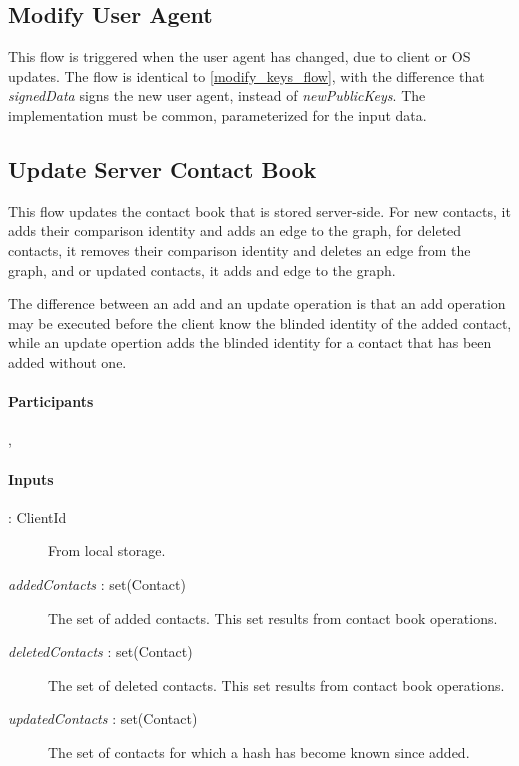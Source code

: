 \documentclass[a4paper,10pt]{article}
\newcommand{\signedData}{\emph{signedData}}
\newcommand{\newPublicKeys}{\emph{newPublicKeys}}
\newcommand{\identity}[1]{\parenthesize{identity}{#1}}
\newcommand{\addedContacts}{{\em addedContacts}}
\newcommand{\deletedContacts}{{\em deletedContacts}}
\newcommand{\updatedContacts}{{\em updatedContacts}}
\begin{document}
\subsection{Modify User Agent}
\label{modify_user_agent_flow}
This flow is triggered when the user agent has changed, due to client or OS updates. The flow is identical to \ref{modify_keys_flow}, with the difference that \signedData{} 
signs the new user agent, instead of \newPublicKeys{}. The implementation must be common, parameterized for the input data.

\subsection{Update Server Contact Book}
\label{update_server_bontact_book_flow}
This flow updates the contact book that is stored server-side. For new contacts, it adds their comparison identity and adds an edge to the graph, for deleted contacts, it removes their comparison identity and deletes an edge from the graph, and or updated contacts, it adds and edge to the graph.

The difference between an add and an update operation is that an add operation may be executed before the client know the blinded identity of the added contact, while an update opertion adds the blinded identity for a contact that has been added without one.

\paragraph{Participants} , \Server{}

\paragraph{Inputs}
\SpecialItem
\begin{description}
 \item[\identity{A} : ClientId] From  local storage.
 \item[\addedContacts{} : set(Contact)] The set of added contacts. This set results from contact book operations.
 \item[\deletedContacts{} : set(Contact)] The set of deleted contacts. This set results from contact book operations.
 \item[\updatedContacts{} : set(Contact)] The set of contacts for which a hash has become known since added.
\end{description}
\end{document}
